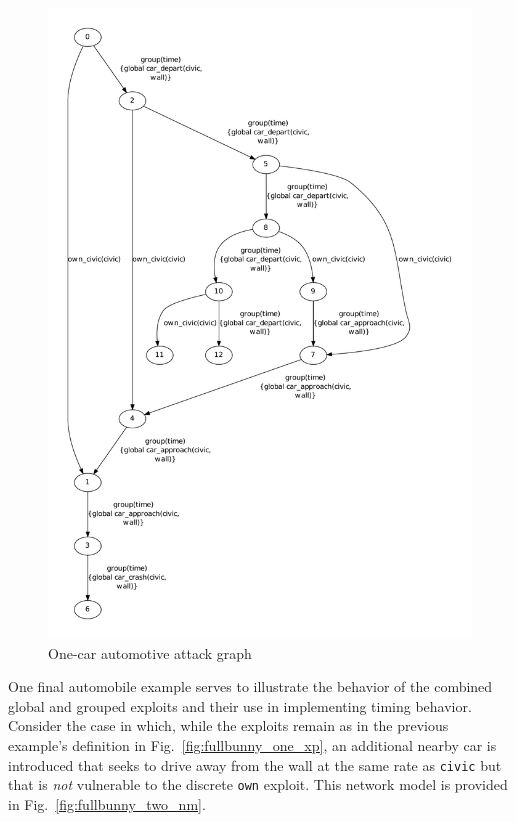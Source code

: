 \begin{figure}
\includegraphics[height=0.9\textheight]{ag_car/onecar/full_bunny_onecar_ag_5}
\caption{One-car automotive attack graph}
\label{fig:fullbunny_one_ag}
\end{figure}

One final automobile example serves to illustrate the behavior of the
combined global and grouped exploits and their use in implementing
timing behavior. Consider the case in which, while the exploits remain
as in the previous example's definition in Fig.~\ref{fig:fullbunny_one_xp},
an additional nearby car is introduced that seeks to drive away from the wall
at the same rate as \texttt{civic} but that is \emph{not} vulnerable to the 
discrete \texttt{own} exploit. This network model is provided in 
Fig.~\ref{fig:fullbunny_two_nm}.

